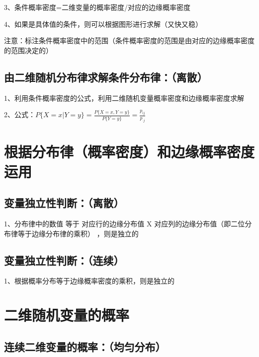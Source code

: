 3、条件概率密度=二维变量的概率密度/对应的边缘概率密度

4、如果是具体值的条件，则可以根据图形进行求解（又快又稳）

注意：标注条件概率密度中的范围（条件概率密度的范围是由对应的边缘概率密度的范围决定的）



\subsection{由二维随机分布律求解条件分布律：（离散）}

1、利用条件概率密度的公式，利用二维随机变量概率密度和边缘概率密度求解

2、公式：$ P\{X=x|Y=y\} = \frac {P\{X=x,Y=y\}}{P\{Y=y\}} = \frac {p_{ij}}{p_{\cdot j}} $



\section{根据分布律（概率密度）和边缘概率密度运用}



\subsection{变量独立性判断：（离散）}

1、分布律中的数值 等于 对应行的边缘分布值 X 对应列的边缘分布值（即二位分布律等于边缘分布律的乘积） ，则是独立的



\subsection{变量独立性判断：（连续）}

1、根据概率分布等于边缘概率密度的乘积，则是独立的

\section{二维随机变量的概率}



\subsection{连续二维变量的概率：（均匀分布）}

